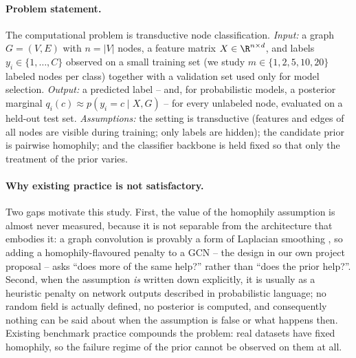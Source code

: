 \documentclass{article}
\begin{document}
\paragraph{Problem statement.} The computational problem is transductive node classification.
\emph{Input:} a graph $G=(V,E)$ with $n=|V|$ nodes, a feature matrix $X\in\R^{n\times d}$, and
labels $y_i\in\{1,\dots,C\}$ observed on a small training set (we study $m\in\{1,2,5,10,20\}$
labeled nodes per class) together with a validation set used only for model selection.
\emph{Output:} a predicted label -- and, for probabilistic models, a posterior marginal
$q_i(c)\approx p(y_i{=}c\mid X,G)$ -- for every unlabeled node, evaluated on a held-out test
set. \emph{Assumptions:} the setting is transductive (features and edges of all nodes are
visible during training; only labels are hidden); the candidate prior is pairwise homophily; and
the classifier backbone is held fixed so that only the treatment of the prior varies.

\paragraph{Why existing practice is not satisfactory.} Two gaps motivate this study. First, the
value of the homophily assumption is almost never measured, because it is not separable from the
architecture that embodies it: a graph convolution is provably a form of Laplacian smoothing
\citep{li2018deeper}, so adding a homophily-flavoured penalty to a GCN -- the design in our own
project proposal -- asks ``does more of the same help?'' rather than ``does the prior help?''.
Second, when the assumption \emph{is} written down explicitly, it is usually as a heuristic
penalty on network outputs described in probabilistic language; no random field is actually
defined, no posterior is computed, and consequently nothing can be said about when the
assumption is false or what happens then. Existing benchmark practice compounds the problem:
real datasets have fixed homophily, so the failure regime of the prior cannot be observed on
them at all.
\end{document}
